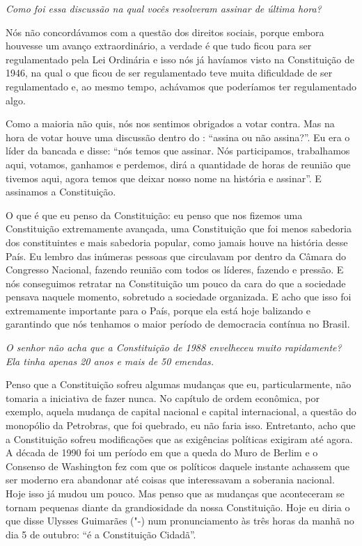 \medskip

\emph{Como foi essa discussão na qual vocês resolveram assinar de
última hora? }

Nós não concordávamos com a questão dos direitos sociais,
porque embora houvesse um avanço extraordinário, a verdade é que tudo
ficou para ser regulamentado pela Lei Ordinária e isso nós já havíamos
visto na Constituição de 1946, na qual o que ficou de ser regulamentado
teve muita dificuldade de ser regulamentado e, ao mesmo tempo, achávamos
que poderíamos ter regulamentado algo.

Como a maioria não quis, nós nos sentimos obrigados a votar contra. Mas
na hora de votar houve uma discussão dentro do : ``assina ou não
assina?''. Eu era o líder da bancada e disse: ``nós temos que assinar.
Nós participamos, trabalhamos aqui, votamos, ganhamos e perdemos, dirá a
quantidade de horas de reunião que tivemos aqui, agora temos que deixar
nosso nome na história e assinar''. E assinamos a Constituição.

O que é que eu penso da Constituição: eu penso que nos fizemos uma
Constituição extremamente avançada, uma Constituição que foi menos
sabedoria dos constituintes e mais sabedoria popular, como jamais houve
na história desse País. Eu lembro das inúmeras pessoas que circulavam
por dentro da Câmara do Congresso Nacional, fazendo reunião com todos os
líderes, fazendo e pressão. E nós conseguimos retratar na Constituição
um pouco da cara do que a sociedade pensava naquele momento, sobretudo a
sociedade organizada. E acho que isso foi extremamente importante para o
País, porque ela está hoje balizando e garantindo que nós tenhamos o
maior período de democracia contínua no Brasil.

\medskip

\emph{O senhor não acha que a Constituição de 1988 envelheceu muito
rapidamente? Ela tinha apenas 20 anos e mais de 50 emendas.}

Penso que a Constituição sofreu algumas mudanças que eu,
particularmente, não tomaria a iniciativa de fazer nunca. No capítulo de
ordem econômica, por exemplo, aquela mudança de capital nacional e
capital internacional, a questão do monopólio da Petrobras, que foi
quebrado, eu não faria isso. Entretanto, acho que a Constituição sofreu
modificações que as exigências políticas exigiram até agora. A década de
1990 foi um período em que a queda do Muro de Berlim e o Consenso de
Washington fez com que os políticos daquele instante achassem que ser
moderno era abandonar até coisas que interessavam a soberania nacional.
Hoje isso já mudou um pouco. Mas penso que as mudanças que aconteceram
se tornam pequenas diante da grandiosidade da nossa Constituição. Hoje
eu diria o que disse Ulysses Guimarães ("-) num pronunciamento às
três horas da manhã no dia 5 de outubro: ``é a Constituição Cidadã''.

